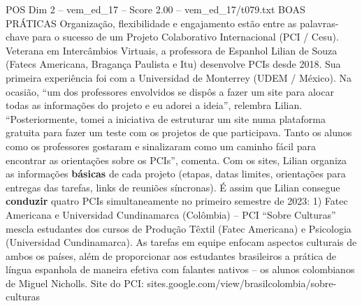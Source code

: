 \begin{textsample}{POS Dim 2 – vem\_ed\_17 – Score 2.00 – vem\_ed\_17/t079.txt}  \label{ex:f2_pos_126}
BOAS PRÁTICAS Organização, flexibilidade e engajamento estão entre as palavras-chave para o sucesso de um Projeto Colaborativo Internacional (PCI / Cesu).
Veterana em Intercâmbios Virtuais, a professora de Espanhol Lilian de Souza (Fatecs Americana, Bragança Paulista e Itu) desenvolve PCIs desde 2018.
Sua primeira experiência foi com a Universidad de Monterrey (UDEM / México).
Na ocasião, “um dos professores envolvidos se dispôs a fazer um site para alocar todas as informações do projeto e eu adorei a ideia”, relembra Lilian. “Posteriormente, tomei a iniciativa de estruturar um site numa plataforma gratuita para fazer um teste com os projetos de que participava.
Tanto os alunos como os professores gostaram e sinalizaram como um caminho fácil para encontrar as orientações sobre os PCIs”, comenta.
Com os sites, Lilian organiza as informações \textbf{básicas} de cada projeto (etapas, datas limites, orientações para entregas das tarefas, links de reuniões síncronas).
É assim que Lilian consegue \textbf{conduzir} quatro PCIs simultaneamente no primeiro semestre de 2023: 1) Fatec Americana e Universidad Cundinamarca (Colômbia) – PCI “Sobre Culturas” mescla estudantes dos cursos de Produção Têxtil (Fatec Americana) e Psicologia (Universidad Cundinamarca).
As tarefas em equipe enfocam aspectos culturais de ambos os países, além de proporcionar aos estudantes brasileiros a prática de língua espanhola de maneira efetiva com falantes nativos – os alunos colombianos de Miguel Nicholls.
Site do PCI: sites.google.com/view/brasilcolombia/sobre-culturas

\end{textsample}
